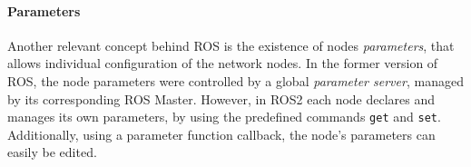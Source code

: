\paragraph{Parameters}
               
Another relevant concept behind ROS is the existence of nodes \textit{parameters}, that allows individual configuration of the network nodes. In the former version of ROS, the node parameters were controlled by a global \textit{parameter server}, managed by its corresponding ROS Master. However, in ROS2 each node declares and manages its own parameters, by using the predefined commands \texttt{get} and \texttt{set}. Additionally, using a parameter function callback, the node's parameters can easily be edited.
               
               
               
               
